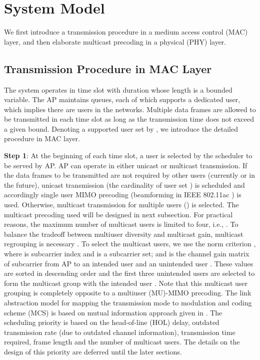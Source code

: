 \documentclass[conference]{IEEEtran}
\newcommand{\0}{\vect{0}}
\newcommand{\1}{\vect{1}}
\begin{document}
\section{System Model} \label{sec:sys}

We first introduce a transmission procedure in a medium access control (MAC) layer, and then elaborate multicast precoding in a physical (PHY) layer.

\subsection{Transmission Procedure in MAC Layer}
The system operates in time slot with duration whose length is a bounded variable. The AP maintains  queues, each of which supports a dedicated user, which implies there are  users in the networks. Multiple data frames are allowed to be transmitted in each time slot as long as the transmission time does not exceed a given bound. Denoting a supported user set by , we introduce the detailed procedure in MAC layer.

{\bf Step 1}: At the beginning of each time slot, a user is selected by the scheduler to be served by AP. AP can operate in either unicast or multicast transmission. If the data frames to be transmitted are not required by other users (currently or in the future), unicast transmission (the cardinality of user set ) is scheduled and accordingly single user MIMO precoding (beamforming in IEEE 802.11ac \cite{IEEE13AC}) is used. Otherwise, multicast transmission for multiple users () is selected. The multicast precoding used will be designed in next subsection. For practical reasons, the maximum number of multicast users is limited to four, i.e., . To balance the tradeoff between multiuser diversity and multicast gain, multicast regrouping is necessary \cite{Low10WC,Tsa11WC}. To select the multicast users, we use the norm criterion , where  is subcarrier index and  is a subcarrier set;  and  is the channel gain matrix of subcarrier  from AP to an intended user  and an unintended user . These values are sorted in descending order and the first three unintended users are selected to form the multicast group with the intended user . Note that this multicast user grouping  is completely opposite to a multiuser (MU)-MIMO precoding. The link abstraction model for mapping the transmission mode to modulation and coding scheme (MCS) is based on mutual information approach given in \cite{Tan08JSAC}.
The scheduling priority is based on the head-of-line (HOL) delay, outdated transmission rate (due to outdated channel information), transmission  time required, frame length and the number of multicast users. The details on the design of this priority are deferred until the later sections.
\end{document}

